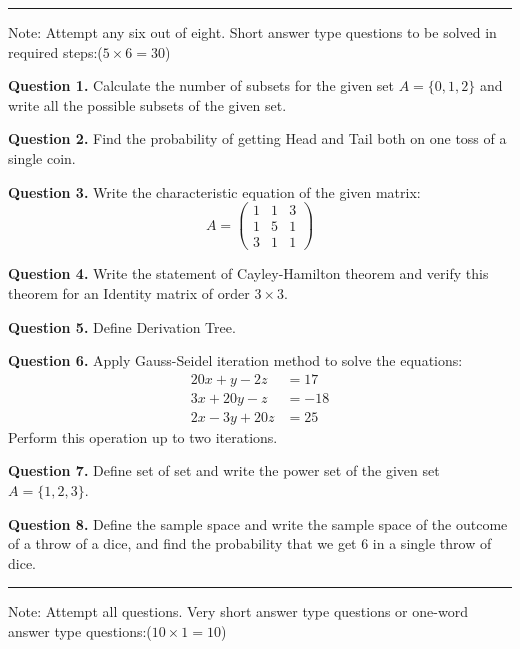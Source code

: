 \documentclass[11pt,a4paper]{article}
\begin{document}
\bigskip{}
\rule{\linewidth}{0.4pt}\smallskip

Note: Attempt any six out of eight. Short answer type questions to be solved in required steps:\hfill ($5 \times 6 = 30$)

\medskip\noindent\textbf{Question 1.} Calculate the number of subsets for the given set $A = \{0, 1, 2\}$ and write all the possible subsets of the given set.

\medskip\noindent\textbf{Question 2.} Find the probability of getting Head and Tail both on one toss of a single coin.

\medskip\noindent\textbf{Question 3.} Write the characteristic equation of the given matrix:
\[
A = \begin{pmatrix}
  1 & 1 & 3 \\
  1 & 5 & 1 \\
  3 & 1 & 1
\end{pmatrix}
\]

\medskip\noindent\textbf{Question 4.} Write the statement of Cayley-Hamilton theorem and verify this theorem for an Identity matrix of order $3 \times 3$.

\medskip\noindent\textbf{Question 5.} Define Derivation Tree.

\medskip\noindent\textbf{Question 6.} Apply Gauss-Seidel iteration method to solve the equations:
\[
\begin{aligned}
  20x + y - 2z &= 17 \\
  3x + 20y - z &= -18 \\
  2x - 3y + 20z &= 25
\end{aligned}
\]
Perform this operation up to two iterations.

\medskip\noindent\textbf{Question 7.} Define set of set and write the power set of the given set $A = \{1, 2, 3\}$.

\medskip\noindent\textbf{Question 8.} Define the sample space and write the sample space of the outcome of a throw of a dice, and find the probability that we get 6 in a single throw of dice.

\bigskip{}
\rule{\linewidth}{0.4pt}\smallskip

Note: Attempt all questions. Very short answer type questions or one-word answer type questions:\hfill ($10 \times 1 = 10$)
\end{document}
